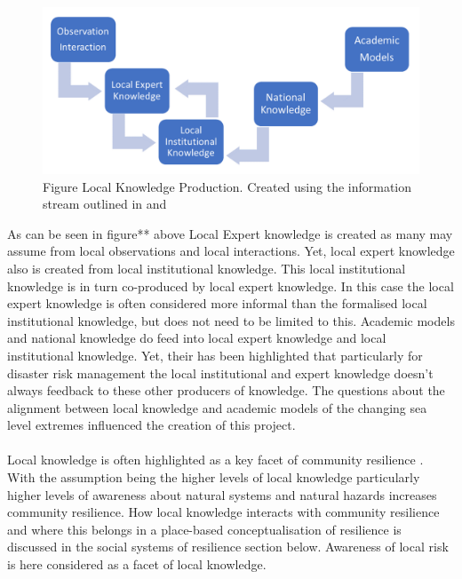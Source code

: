 \begin{figure}[h]
    \centering
    \includegraphics[width=1\textwidth]{fig_theory/local knowledge accumulation.png}
    \caption{Figure Local Knowledge Production. Created using the information stream outlined in \cite{setten_we_2019} and \cite{rod_integrated_2012}}
    \label{fig:local_knowledge}
\end{figure}


As can be seen in figure** above Local Expert knowledge is created as many may assume from local observations and local interactions. Yet, local expert knowledge also is created from local institutional knowledge. This local institutional knowledge is in turn co-produced by local expert knowledge. In this case the local expert knowledge is often considered more informal than the formalised local institutional knowledge, but does not need to be limited to this.  Academic models and national knowledge do feed into local expert knowledge and local institutional knowledge. Yet, their has been highlighted that particularly for disaster risk management the local institutional and expert knowledge doesn't always feedback to these other producers of knowledge\cite{rod_integrated_2012}. The questions about the alignment between local knowledge and academic models of the changing sea level extremes influenced the creation of this project. 

\paragraph{}

Local knowledge is often highlighted as a key facet of community resilience \cite{setten_we_2019}. With the assumption being the higher levels of local knowledge particularly higher levels of awareness about natural systems and natural hazards increases community resilience.  How local knowledge interacts with community resilience and where this belongs in a place-based conceptualisation of resilience is discussed in the social systems of resilience section below. Awareness of local risk is here considered as a facet of local knowledge.  

